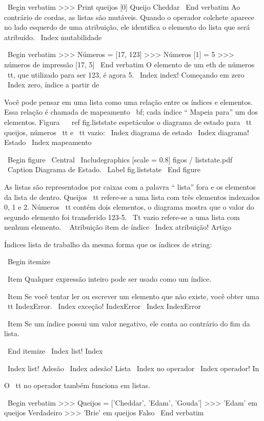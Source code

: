 \documentclass[10pt]{book}
\begin{document}
\begin {itemize}
{{{{{{\ Begin {verbatim}
>>> Print queijos [0]
Queijo Cheddar
\ End {verbatim}
%
Ao contrário de cordas, as listas são mutáveis. Quando o operador colchete aparece
no lado esquerdo de uma atribuição, ele identifica o elemento do
lista que será atribuído.
\ Index {} mutabilidade

\ Begin {verbatim}
>>> Números = [17, 123]
>>> Números [1] = 5
>>> números de impressão
[17, 5]
\ End {verbatim}
%
O elemento de um eth de números {\ tt}, que
utilizado para ser 123, é agora 5.
\ Index {index! Começando em zero}
\ Index {zero, índice a partir de}

Você pode pensar em uma lista como uma relação entre os índices e
elementos. Essa relação é chamada de mapeamento {\ bf}; cada índice
`` Mapeia para'' um dos elementos. Figura ~ \ ref {} fig.liststate espetáculos
o diagrama de estado para {\ tt
queijos}, {números \ tt} e {\ tt vazio}:
\ Index {diagrama de estado}
\ Index {diagrama! Estado}
\ Index {mapeamento}

\ Begin {figure}
\ Central
{\ Includegraphics [scale = 0.8] {figos / liststate.pdf}}
\ Caption {Diagrama de Estado.}
\ Label {} fig.liststate
\ End {figure}

As listas são representados por caixas com a palavra `` lista'' fora
e os elementos da lista de dentro. {Queijos \ tt} refere-se a
uma lista com três elementos indexados 0, 1 e 2.
{Números \ tt} contém dois elementos, o diagrama mostra que o
valor do segundo elemento foi transferido 123-5.
{\ Tt vazio} refere-se a uma lista com nenhum elemento.
\ {} Atribuição item de índice
\ Index {atribuição! Artigo}

Índices lista de trabalho da mesma forma que os índices de string:

\ Begin {itemize}

\ Item Qualquer expressão inteiro pode ser usado como um índice.

\ Item Se você tentar ler ou escrever um elemento que não existe, você
obter uma {\ tt IndexError}.
\ Index {exceção! IndexError}
\ Index {} IndexError

\ Item Se um índice possui um valor negativo, ele conta ao contrário do
fim da lista.

\ End {itemize}
\ Index {list! Index}

\ Index {list! Adesão}
\ Index {adesão! Lista}
\ Index {} no operador
\ Index {operador! In}

O {\ tt no} operador também funciona em listas.

\ Begin {verbatim}
>>> Queijos = ['Cheddar', 'Edam', 'Gouda']
>>> 'Edam' em queijos
Verdadeiro
>>> 'Brie' em queijos
Falso
\ End {verbatim}


}}}}}}
\end{itemize}
\end{document}
